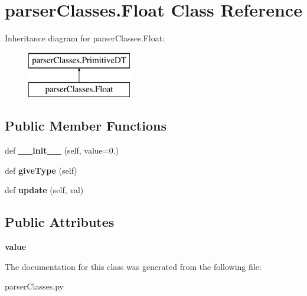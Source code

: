 \hypertarget{classparser_classes_1_1_float}{}\section{parser\+Classes.\+Float Class Reference}
\label{classparser_classes_1_1_float}
Inheritance diagram for parser\+Classes.\+Float\+:\begin{figure}[H]
\begin{center}
\leavevmode
\includegraphics[height=2.000000cm]{classparser_classes_1_1_float}
\end{center}
\end{figure}
\subsection*{Public Member Functions}
\begin{DoxyCompactItemize}
\item 
def {\bfseries \+\_\+\+\_\+init\+\_\+\+\_\+} (self, value=0.)\hypertarget{classparser_classes_1_1_float_a6b381bc911c79a2e93df1627ca2267df}{}\label{classparser_classes_1_1_float_a6b381bc911c79a2e93df1627ca2267df}

\item 
def {\bfseries give\+Type} (self)\hypertarget{classparser_classes_1_1_float_a5570384fde83d172e3fe1b176be8521e}{}\label{classparser_classes_1_1_float_a5570384fde83d172e3fe1b176be8521e}

\item 
def {\bfseries update} (self, val)\hypertarget{classparser_classes_1_1_float_a825903e0f131e7169e28fab644c26344}{}\label{classparser_classes_1_1_float_a825903e0f131e7169e28fab644c26344}

\end{DoxyCompactItemize}
\subsection*{Public Attributes}
\begin{DoxyCompactItemize}
\item 
{\bfseries value}\hypertarget{classparser_classes_1_1_float_abb886ca1c6bbaa84a9b08d57db80b4c7}{}\label{classparser_classes_1_1_float_abb886ca1c6bbaa84a9b08d57db80b4c7}

\end{DoxyCompactItemize}


The documentation for this class was generated from the following file\+:\begin{DoxyCompactItemize}
\item 
parser\+Classes.\+py\end{DoxyCompactItemize}
